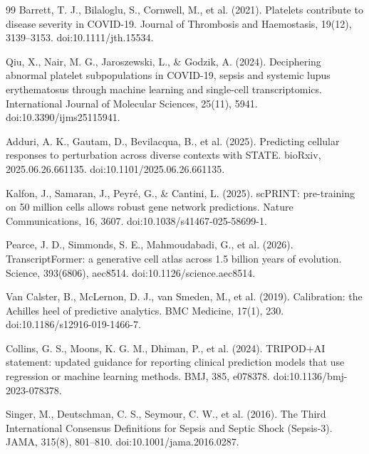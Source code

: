 \documentclass[11pt,a4paper]{article}
\begin{document}
\begin{thebibliography}{99}
Barrett, T. J., Bilaloglu, S., Cornwell, M., et al. (2021).
\newblock Platelets contribute to disease severity in COVID-19.
\newblock Journal of Thrombosis and Haemostasis, 19(12), 3139--3153. doi:10.1111/jth.15534.

Qiu, X., Nair, M. G., Jaroszewski, L., \& Godzik, A. (2024).
\newblock Deciphering abnormal platelet subpopulations in COVID-19, sepsis and systemic lupus erythematosus through machine learning and single-cell transcriptomics.
\newblock International Journal of Molecular Sciences, 25(11), 5941. doi:10.3390/ijms25115941.

Adduri, A. K., Gautam, D., Bevilacqua, B., et al. (2025).
\newblock Predicting cellular responses to perturbation across diverse contexts with STATE.
\newblock bioRxiv, 2025.06.26.661135. doi:10.1101/2025.06.26.661135.

Kalfon, J., Samaran, J., Peyr\'{e}, G., \& Cantini, L. (2025).
\newblock scPRINT: pre-training on 50 million cells allows robust gene network predictions.
\newblock Nature Communications, 16, 3607. doi:10.1038/s41467-025-58699-1.

Pearce, J. D., Simmonds, S. E., Mahmoudabadi, G., et al. (2026).
\newblock TranscriptFormer: a generative cell atlas across 1.5 billion years of evolution.
\newblock Science, 393(6806), aec8514. doi:10.1126/science.aec8514.

Van Calster, B., McLernon, D. J., van Smeden, M., et al. (2019).
\newblock Calibration: the Achilles heel of predictive analytics.
\newblock BMC Medicine, 17(1), 230. doi:10.1186/s12916-019-1466-7.

Collins, G. S., Moons, K. G. M., Dhiman, P., et al. (2024).
\newblock TRIPOD+AI statement: updated guidance for reporting clinical prediction models that use regression or machine learning methods.
\newblock BMJ, 385, e078378. doi:10.1136/bmj-2023-078378.

Singer, M., Deutschman, C. S., Seymour, C. W., et al. (2016).
\newblock The Third International Consensus Definitions for Sepsis and Septic Shock (Sepsis-3).
\newblock JAMA, 315(8), 801--810. doi:10.1001/jama.2016.0287.


\end{thebibliography}
\end{document}
